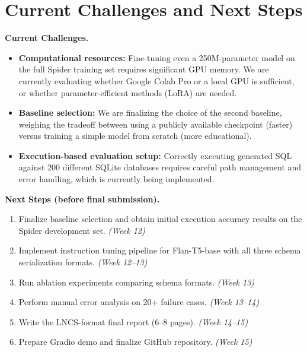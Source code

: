 \documentclass[11pt,a4paper]{article}
\begin{document}

\section{Current Challenges and Next Steps}


\noindent\textbf{Current Challenges.}
\begin{itemize}[noitemsep]
  \item \textbf{Computational resources:} Fine-tuning even a 250M-parameter
        model on the full Spider training set requires significant GPU memory.
        We are currently evaluating whether Google Colab Pro or a local GPU
        is sufficient, or whether parameter-efficient methods (LoRA) are needed.
  \item \textbf{Baseline selection:} We are finalizing the choice of the
        second baseline, weighing the tradeoff between using a publicly available
        checkpoint (faster) versus training a simple model from scratch (more
        educational).
  \item \textbf{Execution-based evaluation setup:} Correctly executing generated
        SQL against 200 different SQLite databases requires careful path management
        and error handling, which is currently being implemented.
\end{itemize}

\noindent\textbf{Next Steps (before final submission).}
\begin{enumerate}[noitemsep]
  \item Finalize baseline selection and obtain initial execution accuracy results
        on the Spider development set. \hfill \textit{(Week 12)}
  \item Implement instruction tuning pipeline for Flan-T5-base with all three
        schema serialization formats. \hfill \textit{(Week 12–13)}
  \item Run ablation experiments comparing schema formats. \hfill \textit{(Week 13)}
  \item Perform manual error analysis on 20+ failure cases. \hfill \textit{(Week 13–14)}
  \item Write the LNCS-format final report (6–8 pages). \hfill \textit{(Week 14–15)}
  \item Prepare Gradio demo and finalize GitHub repository. \hfill \textit{(Week 15)}
\end{enumerate}
\end{document}
